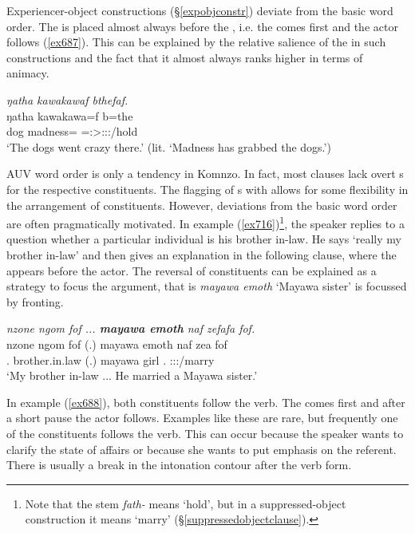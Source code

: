 Experiencer-object constructions ({\S}\ref{expobjconstr}) deviate from the basic word order. The  is placed almost always before the , i.e. the  comes first and the actor follows (\ref{ex687}). This can be explained by the relative salience of the  in such constructions and the fact that it almost always ranks higher in terms of animacy.

\begin{exe}
	\ex \emph{ŋatha kawakawaf bthefaf.}\\
	\gll ŋatha kawakawa=f b=the\\
	dog madness={\Erg} \Med=\Stsg:\Sbj>\Stpl:\Obj:\Rpst:\Pfv/hold\\
	\trans `The dogs went crazy there.' (lit. `Madness has grabbed the dogs.')\\
	\label{ex687}
\end{exe}

AUV word order is only a tendency in Komnzo. In fact, most clauses lack overt s for the respective constituents. The flagging of s with  allows for some flexibility in the arrangement of constituents. However, deviations from the basic word order are often pragmatically motivated. In example (\ref{ex716})\footnote{Note that the stem \emph{fath-} means `hold', but in a suppressed-object construction it means `marry' ({\S}\ref{suppressedobjectclause}).}, the speaker replies to a question whether a particular individual is his brother in-law. He says `really my brother in-law' and then gives an explanation in the following clause, where the  appears before the actor. The reversal of constituents can be explained as a strategy to focus the  argument, that is \emph{mayawa emoth} `Mayawa sister' is focussed by fronting.

\begin{exe}
	\ex \emph{nzone ngom fof ... \textbf{mayawa emoth} naf zefafa fof.}\\
	\gll nzone ngom fof (.) mayawa emoth naf zea fof\\
	\Fsg.{\Poss} brother.in.law {\Emph} (.) mayawa girl \Tsg.{\Erg} \Sg:\Sbj:\Pst:\Pfv/marry \Emph\\
	\trans `My brother in-law ... He married a Mayawa sister.'
	\label{ex716}
\end{exe}

In example (\ref{ex688}), both constituents follow the verb. The  comes first and after a short pause the actor follows. Examples like these are rare, but frequently one of the constituents follows the verb. This can occur because the speaker wants to clarify the state of affairs or because she wants to put emphasis on the referent. There is usually a break in the intonation contour after the verb form.

